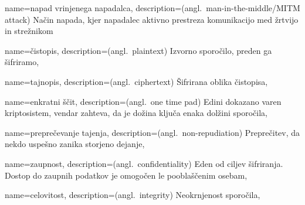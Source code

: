 \documentclass[12pt,a4paper,openany,tikz]{book}
\theoremstyle{plain}
\theoremstyle{definition}
\begin{document}



{
  name={napad vrinjenega napadalca},
  description={(angl.\ man-in-the-middle/MITM attack) Način napada, kjer napadalec aktivno prestreza komunikacijo med žrtvijo in strežnikom}
}

{
  name=čistopis,
  description={(angl.\ plaintext) Izvorno sporočilo, preden ga šifriramo},
}

{
  name=tajnopis,
  description={(angl.\ ciphertext) Šifrirana oblika čistopisa},
}

{
  name=enkratni ščit,
  description={(angl.\ one time pad) Edini dokazano varen kriptosistem, vendar zahteva, da je dožina ključa enaka dolžini sporočila},
}

{
  name=preprečevanje tajenja,
  description={(angl.\ non-repudiation) Preprečitev, da nekdo uspešno zanika storjeno dejanje},
}

{
  name=zaupnost,
  description={(angl.\ confidentiality) Eden od ciljev šifriranja. Dostop do zaupnih podatkov je omogočen le pooblaščenim osebam},
}

{
  name=celovitost,
  description={(angl.\ integrity) Neokrnjenost sporočila},
}
\end{document}
